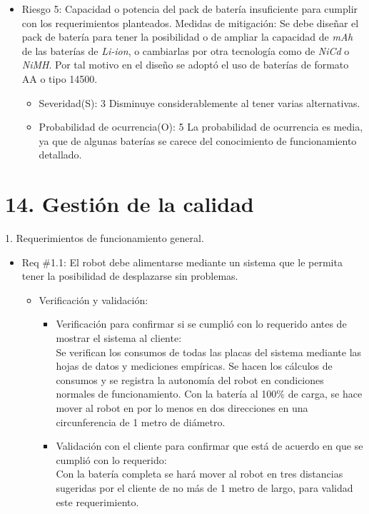 \documentclass[
11pt, %
codirector, %
]{charter}
\begin{document}
\begin{itemize}
\begin{itemize}
	\end{itemize}
\item Riesgo 5: Capacidad o potencia del pack de batería	insuficiente para cumplir con los requerimientos planteados.
	Medidas de mitigación: Se debe diseñar el pack de batería para tener la posibilidad o de ampliar la capacidad de \textit{mAh} de las baterías de \textit{Li-ion}, o cambiarlas por otra tecnología como de \textit{NiCd} o \textit{NiMH}. Por tal motivo en el diseño se adoptó el uso de baterías de formato AA o tipo 14500.
	\begin{itemize}
	\item Severidad(S): 3 Disminuye considerablemente al tener varias alternativas.
	\item  Probabilidad de ocurrencia(O): 5 La probabilidad de ocurrencia es media, ya que de algunas baterías se carece del conocimiento de funcionamiento detallado. 
	\end{itemize}
\end{itemize}


\section{14. Gestión de la calidad}
\label{sec:calidad}

1. Requerimientos de funcionamiento general.
\begin{itemize} 
\item Req \#1.1: El robot debe alimentarse mediante un sistema que le permita tener la posibilidad de desplazarse sin problemas.
\begin{itemize}
\item Verificación y validación:
	\begin{itemize}
	\item Verificación para confirmar si se cumplió con lo requerido 	antes de mostrar el sistema al cliente:\\
	Se verifican los consumos de todas las placas del sistema 				mediante las hojas de datos y mediciones empíricas. Se hacen los 	cálculos de consumos y se registra la autonomía del robot en 			condiciones normales de funcionamiento. Con la batería al 100\%
	 de carga, se hace mover al robot en por lo menos en dos direcciones en una circunferencia de 1 metro de diámetro.
	\item Validación con el cliente para confirmar que está de 				acuerdo en que se cumplió con lo requerido:\\
	Con la batería completa se hará mover al robot en tres distancias sugeridas por el cliente de no más de 1 metro de largo, para validad 	este requerimiento.
	\end{itemize}
\end{itemize}	
\end{itemize}
\end{document}
